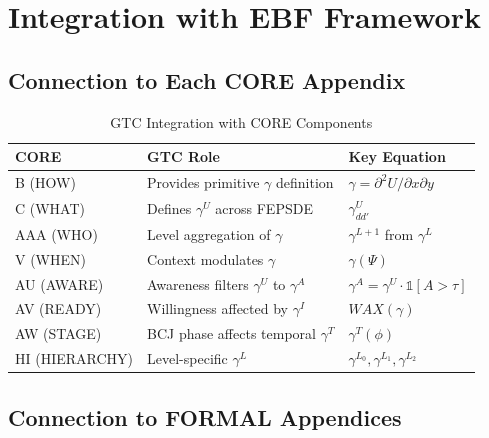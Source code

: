 \section{Integration with EBF Framework}
\label{sec:gtc-integration}

\subsection{Connection to Each CORE Appendix}

\begin{table}[H]
\centering
\caption{GTC Integration with CORE Components}
\label{tab:gtc-core-integration}
\renewcommand{\arraystretch}{1.4}
\begin{tabular}{@{}lll@{}}
\toprule
\textbf{CORE} & \textbf{GTC Role} & \textbf{Key Equation} \\
\midrule
B (HOW) & Provides primitive $\gamma$ definition & $\gamma = \partial^2 U / \partial x \partial y$ \\
C (WHAT) & Defines $\gamma^U$ across FEPSDE & $\gamma^U_{dd'}$ \\
AAA (WHO) & Level aggregation of $\gamma$ & $\gamma^{L+1}$ from $\gamma^L$ \\
V (WHEN) & Context modulates $\gamma$ & $\gamma(\Psi)$ \\
AU (AWARE) & Awareness filters $\gamma^U$ to $\gamma^A$ & $\gamma^A = \gamma^U \cdot \mathbb{1}[A > \tau]$ \\
AV (READY) & Willingness affected by $\gamma^I$ & $WAX(\gamma)$ \\
AW (STAGE) & BCJ phase affects temporal $\gamma^T$ & $\gamma^T(\phi)$ \\
HI (HIERARCHY) & Level-specific $\gamma^L$ & $\gamma^{L_0}, \gamma^{L_1}, \gamma^{L_2}$ \\
\bottomrule
\end{tabular}
\end{table}

\subsection{Connection to FORMAL Appendices}

